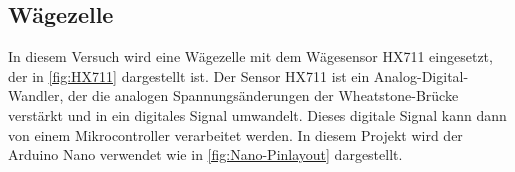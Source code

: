 \subsection{Wägezelle}

In diesem Versuch wird eine Wägezelle mit dem Wägesensor HX711 eingesetzt, der in \autoref{fig:HX711} dargestellt ist.
Der Sensor HX711 ist ein Analog-Digital-Wandler, der die analogen Spannungsänderungen der Wheatstone-Brücke verstärkt und in ein digitales Signal umwandelt.
Dieses digitale Signal kann dann von einem Mikrocontroller verarbeitet werden.
In diesem Projekt wird der Arduino Nano verwendet wie in \autoref{fig:Nano-Pinlayout} dargestellt.
\\

